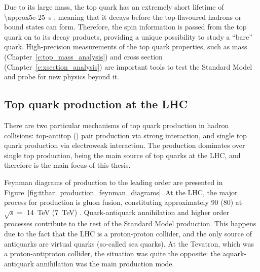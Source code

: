 Due to its large mass, the top quark has an extremely short lifetime of \SI{\approx5e-25}{\s} \autocite{PDG}, meaning
that it decays before the top-flavoured hadrons or \ttbar bound states can form. Therefore, the spin information is
passed from the top quark on to its decay products, providing a unique possibility to study a ``bare'' quark.
High-precision measurements of the top quark properties, such as mass (Chapter~\ref{c:top_mass_analysis}) and cross
section (Chapter~\ref{c:xsection_analysis}) are important tools to test the Standard Model and probe for new physics
beyond it.

\subsection{Top quark production at the LHC}
\label{ss:top_production}
There are two particular mechanisms of top quark production in hadron collisions: top-antitop (\ttbar) pair production
via strong interaction, and single top quark production via electroweak interaction. The \ttbar production dominates
over single top production, being the main source of top quarks at the LHC, and therefore is the main focus of this
thesis.

Feynman diagrams of \ttbar production to the leading order are presented in
Figure~\ref{fig:ttbar_production_feynman_diagrams}. At the LHC, the major process for \ttbar production is gluon fusion,
constituting approximately \SI{90}{\pc} (\SI{80}{\pc}) at $\sqrt s =$ \SI{14}{\TeV} (\SI{7}{\TeV}) \autocite{PDG}.
Quark-antiquark annihilation and higher order processes contribute to the rest of the Standard Model \ttbar production.
This happens due to the fact that the LHC is a proton-proton collider, and the only source of antiquarks are virtual
quarks (so-called sea quarks). At the Tevatron, which was a proton-antiproton collider, the situation was quite the
opposite: the aquark-antiquark annihilation was the main \ttbar production mode.

